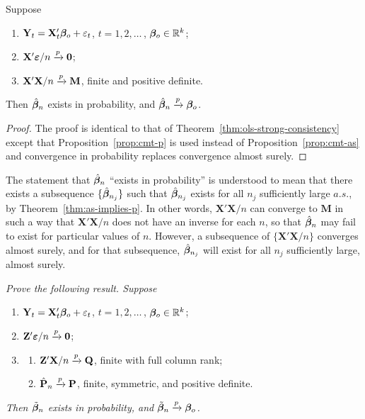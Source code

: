 \begin{theorem}\label{thm:ols-weak-consistency}
Suppose
\begin{enumerate}[label=$(\roman*)$]
\item $\mathbf{Y}_t = \mathbf{X}_t'\boldsymbol{\beta}_o + \varepsilon_t$, \quad $t = 1, 2, \ldots$\,, $\boldsymbol{\beta}_o \in \mathbb{R}^k$;
\item $\mathbf{X}'\boldsymbol{\varepsilon}/n \xrightarrow{p} \mathbf{0}$;
\item $\mathbf{X}'\mathbf{X}/n \xrightarrow{p} \mathbf{M}$, finite and positive definite.
\end{enumerate}
Then $\hat{\boldsymbol{\beta}}_n$ exists in probability, and $\hat{\boldsymbol{\beta}}_n \xrightarrow{p} \boldsymbol{\beta}_o$.
\end{theorem}

\begin{proof}
The proof is identical to that of Theorem~\ref{thm:ols-strong-consistency} except that Proposition~\ref{prop:cmt-p} is used instead of Proposition~\ref{prop:cmt-as} and convergence in probability
replaces convergence almost surely.
\end{proof}

The statement that $\hat{\boldsymbol{\beta}}_n$ ``exists in probability'' is understood to mean that
there exists a subsequence $\{\hat{\boldsymbol{\beta}}_{n_j}\}$ such that $\hat{\boldsymbol{\beta}}_{n_j}$ exists for all $n_j$ sufficiently
large $a.s.$, by Theorem~\ref{thm:as-implies-p}. In other words, $\mathbf{X}'\mathbf{X}/n$ can converge to $\mathbf{M}$
in such a way that $\mathbf{X}'\mathbf{X}/n$ does not have an inverse for each $n$, so that
$\hat{\boldsymbol{\beta}}_n$ may fail to exist for particular values of $n$. However, a subsequence of
$\{\mathbf{X}'\mathbf{X}/n\}$ converges almost surely, and for that subsequence, $\hat{\boldsymbol{\beta}}_{n_j}$ will exist
for all $n_j$ sufficiently large, almost surely.

\begin{exercises}
\item\label{ex:2.29} \emph{Prove the following result. Suppose}
\begin{enumerate}[label=$(\roman*)$]
\item $\mathbf{Y}_t = \mathbf{X}_t'\boldsymbol{\beta}_o + \varepsilon_t$, \quad $t = 1, 2, \ldots$\,, $\boldsymbol{\beta}_o \in \mathbb{R}^k$;
\item $\mathbf{Z}'\boldsymbol{\varepsilon}/n \xrightarrow{p} \mathbf{0}$;
\item[\emph{(iii)}] \begin{enumerate}[label=$(\alph*)$]
\item $\mathbf{Z}'\mathbf{X}/n \xrightarrow{p} \mathbf{Q}$, finite with full column rank;
\item $\hat{\mathbf{P}}_n \xrightarrow{p} \mathbf{P}$, finite, symmetric, and positive definite.
\end{enumerate}
\end{enumerate}
\emph{Then $\tilde{\boldsymbol{\beta}}_n$ exists in probability, and $\tilde{\boldsymbol{\beta}}_n \xrightarrow{p} \boldsymbol{\beta}_o$.}
\end{exercises}

